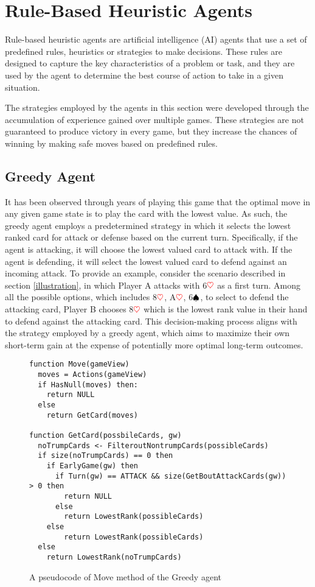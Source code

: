 \section{Rule-Based Heuristic Agents}

Rule-based heuristic agents are artificial intelligence (AI) agents that use a set of predefined rules, heuristics or strategies to make decisions. These rules are designed to capture the key characteristics of a problem or task, and they are used by the agent to determine the best course of action to take in a given situation.

The strategies employed by the agents in this section were developed through the accumulation of experience gained over multiple games. These strategies are not guaranteed to produce victory in every game, but they increase the chances of winning by making safe moves based on predefined rules. 

\subsection{Greedy Agent}

It has been observed through years of playing this game that the optimal move in any given game state is to play the card with the lowest value. As such, the greedy agent employs a predetermined strategy in which it selects the lowest ranked card for attack or defense based on the current turn. Specifically, if the agent is attacking, it will choose the lowest valued card to attack with. If the agent is defending, it will select the lowest valued card to defend against an incoming attack. To provide an example, consider the scenario described in section \ref{illustration}, in which Player A attacks with 6$\textcolor{red}{\heartsuit}$ as a first turn. Among all the possible options, which includes 8$\textcolor{red}{\heartsuit}$, A$\textcolor{red}{\heartsuit}$, 6$\textcolor{black}{\spadesuit}$, to select to defend the attacking card, Player B chooses 8$\textcolor{red}{\heartsuit}$ which is the lowest rank value in their hand to defend against the attacking card. This decision-making process aligns with the strategy employed by a greedy agent, which aims to maximize their own short-term gain at the expense of potentially more optimal long-term outcomes.

\begin{figure}[h]
\captionsetup{justification=centering}
\begin{lstlisting}[frame=single]
function Move(gameView)
  moves = Actions(gameView)
  if HasNull(moves) then:
  	return NULL
  else
  	return GetCard(moves)

function GetCard(possbileCards, gw)
  noTrumpCards <- FilteroutNontrumpCards(possibleCards)
  if size(noTrumpCards) == 0 then
	if EarlyGame(gw) then
	  if Turn(gw) == ATTACK && size(GetBoutAttackCards(gw)) > 0 then
		return NULL
	  else
		return LowestRank(possibleCards)
	else
		return LowestRank(possibleCards)
  else
	return LowestRank(noTrumpCards)
\end{lstlisting}
\caption{A pseudocode of Move method of the Greedy agent}
\label{fig:greedyMove}
\end{figure}

